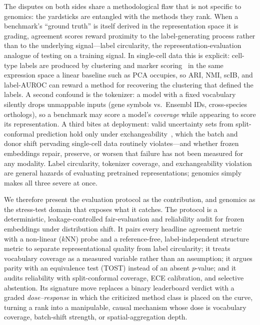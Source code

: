 \documentclass[fleqn,10pt,lineno]{wlpeerj}  %
\begin{document}
The disputes on both sides share a methodological flaw that is not specific to genomics: the yardsticks are entangled with the methods they rank. When a benchmark's ``ground truth'' is itself derived in the representation space it is grading, agreement scores reward proximity to the label-generating process rather than to the underlying signal---label circularity, the representation-evaluation analogue of testing on a training signal. In single-cell data this is explicit: cell-type labels are produced by clustering and marker scoring~\cite{wolf2018scanpy} in the same expression space a linear baseline such as PCA occupies, so ARI, NMI, scIB, and label-AUROC can reward a method for recovering the clustering that defined the labels. A second confound is the tokenizer: a model with a fixed vocabulary silently drops unmappable inputs (gene symbols vs.\ Ensembl IDs, cross-species orthologs), so a benchmark may score a model's \emph{coverage} while appearing to score its representation. A third bites at deployment: valid uncertainty sets from split-conformal prediction hold only under exchangeability~\cite{barber2023}, which the batch and donor shift pervading single-cell data routinely violates---and whether frozen embeddings repair, preserve, or worsen that failure has not been measured for any modality. Label circularity, tokenizer coverage, and exchangeability violation are general hazards of evaluating pretrained representations; genomics simply makes all three severe at once.

We therefore present the evaluation protocol as the contribution, and genomics as the stress-test domain that exposes what it catches. The protocol is a deterministic, leakage-controlled fair-evaluation and reliability audit for frozen embeddings under distribution shift. It pairs every headline agreement metric with a non-linear ($k$NN) probe and a reference-free, label-independent structure metric to separate representational quality from label circularity; it treats vocabulary coverage as a measured variable rather than an assumption; it argues parity with an equivalence test (TOST) instead of an absent $p$-value; and it audits reliability with split-conformal coverage, ECE calibration, and selective abstention. Its signature move replaces a binary leaderboard verdict with a graded \emph{dose--response} in which the criticized method class is placed on the curve, turning a rank into a manipulable, causal mechanism whose dose is vocabulary coverage, batch-shift strength, or spatial-aggregation depth.
\end{document}
